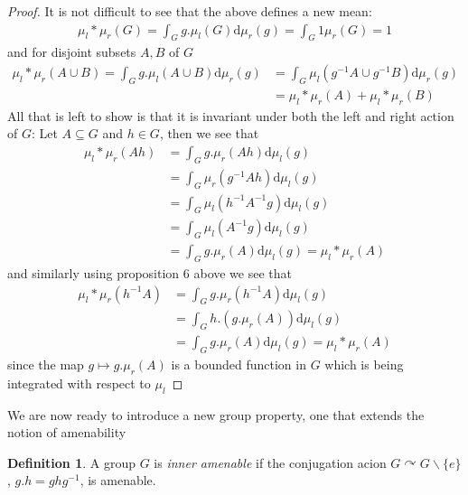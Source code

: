 \documentclass[10pt,oneside,openany,final]{memoir}
\theoremstyle{definition}
\newtheorem{definition}[theorem]{Definition}
\theoremstyle{Break}
\renewcommand{\d}{\mathrm{d}}
\def\acts{\curvearrowright}
\begin{document}
\begin{proof}
	It is not difficult to see that the above defines a new mean:
	\begin{align*}
		\mu_l \ast \mu_r (G) = \int_G g.\mu_l(G) \d \mu_r(g)=\int_G 1 \mu_r(G) = 1
	\end{align*}
	and for disjoint subsets $A,B$ of $G$
	\begin{align*}
		\mu_l \ast \mu_r (A \cup B) = \int_G g.\mu_l(A \cup B) \d \mu_r(g)&=\int_G \mu_l(g^{-1}A \cup g^{-1}B) \d \mu_r(g)\\
		&= \mu_l \ast \mu_r (A) + \mu_l \ast \mu_r(B)
	\end{align*}
	All that is left to show is that it is invariant under both the left and right action of $G$: Let $A \subseteq G$ and $h \in G$, then we see that
	\begin{align*}
		\mu_l \ast \mu_r(Ah)&=\int_G g.\mu_r(Ah) \d \mu_l(g)\\
		&= \int_G \mu_r(g^{-1}Ah) \d \mu_l (g)\\
		&= \int_G \mu_l(h^{-1}A^{-1}g) \d \mu_l(g)\\
		&=\int_G \mu_l (A^{-1}g) \d \mu_l(g)\\
		&=\int_G g.\mu_r(A) \d \mu_l(g)= \mu_l \ast \mu_r(A)
	\end{align*}
	and similarly using proposition 6 above we see that
	\begin{align*}
		\mu_l \ast \mu_r(h^{-1}A) &= \int_G g. \mu_r(h^{-1}A) \d \mu_l(g) \\&=\int_G h.(g.\mu_r(A)) \d \mu_l(g)\\&= \int_G g.\mu_r(A) \d \mu_l(g)= \mu_l \ast \mu_r(A)	
	\end{align*}
	since the map $g \mapsto g.\mu_r(A)$ is a bounded function in $G$ which is being integrated with respect to $\mu_l$
\end{proof}
We are now ready to introduce a new group property, one that extends the notion of amenability
\begin{definition}
	A group $G$ is \emph{inner amenable} if the conjugation acion $G \acts G\backslash\{e\}$, $g.h=ghg^{-1}$, is amenable.
\end{definition}
\end{document}
